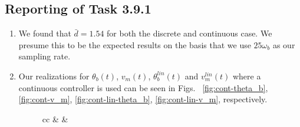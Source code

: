 \documentclass[11pt]{article} %
\begin{document}
\subsection*{Reporting of Task 3.9.1}
\begin{enumerate}
\item %
  We found that $\bar{d} = 1.54$ for both the discrete and
  continuous case. We presume this to be the expected results on the
  basis that we use $25\omega_b$ as our sampling rate.
\item %
  Our realizations for $\theta_b(t)$, $v_m(t)$, $\theta^{lin}_b(t)$
  and $v^{lin}_m(t)$ where a continuous controller is used can be seen
  in Figs.~
  \ref{fig:cont-theta_b},
  \ref{fig:cont-v_m},
  \ref{fig:cont-lin-theta_b},
  \ref{fig:cont-lin-v_m},
  respectively.
  \begin{figure}
    \centering
    \begin{tabular}{cc}
        &
      &

\end{tabular}
\end{figure}
\end{enumerate}
\end{document}
